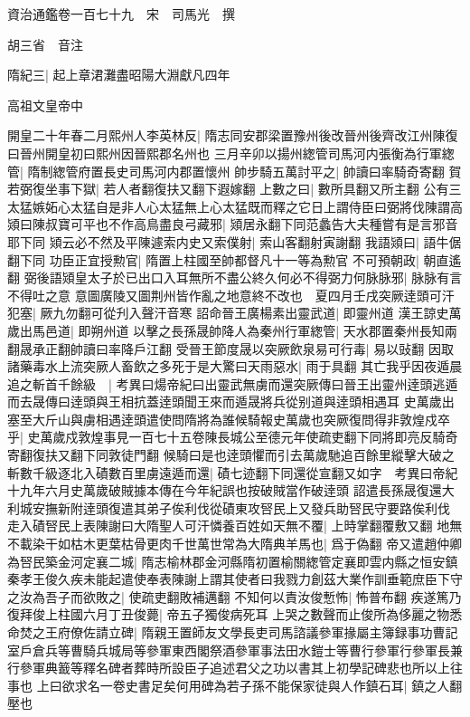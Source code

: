 資治通鑑卷一百七十九　宋　司馬光　撰

胡三省　音注

隋紀三|{
	起上章涒灘盡昭陽大淵獻凡四年}


高祖文皇帝中

開皇二十年春二月熙州人李英林反|{
	隋志同安郡梁置豫州後改晉州後齊改江州陳復曰晉州開皇初曰熙州因晉熙郡名州也}
三月辛卯以揚州緫管司馬河内張衡為行軍緫管|{
	隋制緫管府置長史司馬河内郡置懷州}
帥步騎五萬討平之|{
	帥讀曰率騎奇寄翻}
賀若弼復坐事下獄|{
	若人者翻復扶又翻下遐嫁翻}
上數之曰|{
	數所具翻又所主翻}
公有三太猛嫉妬心太猛自是非人心太猛無上心太猛既而釋之它日上謂侍臣曰弼將伐陳謂高熲曰陳叔寶可平也不作高鳥盡良弓藏邪|{
	熲居永翻下同范蠡告大夫種嘗有是言邪音耶下同}
熲云必不然及平陳遽索内史又索僕射|{
	索山客翻射寅謝翻}
我語熲曰|{
	語牛倨翻下同}
功臣正宜授勲官|{
	隋置上柱國至帥都督凡十一等為勲官}
不可預朝政|{
	朝直遙翻}
弼後語熲皇太子於已出口入耳無所不盡公終久何必不得弼力何脉脉邪|{
	脉脉有言不得吐之意}
意圖廣陵又圖荆州皆作亂之地意終不改也　夏四月壬戌突厥逹頭可汗犯塞|{
	厥九勿翻可從刋入聲汗音寒}
詔命晉王廣楊素出靈武道|{
	即靈州道}
漢王諒史萬歲出馬邑道|{
	即朔州道}
以擊之長孫晟帥降人為秦州行軍緫管|{
	天水郡置秦州長知兩翻晟承正翻帥讀曰率降戶江翻}
受晉王節度晟以突厥飲泉易可行毒|{
	易以䜴翻}
因取諸藥毒水上流突厥人畜飲之多死于是大驚曰天雨惡水|{
	雨于具翻}
其亡我乎因夜遁晨追之斬首千餘級　|{
	考異曰煬帝紀曰出靈武無虜而還突厥傳曰晉王出靈州逹頭逃遁而去晟傳曰逹頭與王相抗蓋逹頭聞王來而遁晟將兵從别道與逹頭相遇耳}
史萬歲出塞至大斤山與虜相遇逹頭遣使問隋將為誰候騎報史萬歲也突厥復問得非敦煌戍卒乎|{
	史萬歲戍敦煌事見一百七十五卷陳長城公至德元年使疏吏翻下同將即亮反騎奇寄翻復扶又翻下同敦徒門翻}
候騎曰是也逹頭懼而引去萬歲馳追百餘里縱擊大破之斬數千級逐北入磧數百里虜遠遁而還|{
	磧七迹翻下同還從宣翻又如字　考異曰帝紀十九年六月史萬歲破賊據本傳在今年紀誤也按破賊當作破逹頭}
詔遣長孫晟復還大利城安撫新附逹頭復遣其弟子俟利伐從磧東攻唘民上又發兵助唘民守要路俟利伐走入磧唘民上表陳謝曰大隋聖人可汗憐養百姓如天無不覆|{
	上時掌翻覆敷又翻}
地無不載染干如枯木更葉枯骨更肉千世萬世常為大隋典羊馬也|{
	爲于偽翻}
帝又遣趙仲卿為唘民築金河定襄二城|{
	隋志榆林郡金河縣隋初置榆關緫管定襄即雲内縣之恒安鎮}
秦孝王俊久疾未能起遣使奉表陳謝上謂其使者曰我戮力創茲大業作訓垂範庶臣下守之汝為吾子而欲敗之|{
	使疏吏翻敗補邁翻}
不知何以責汝俊慙怖|{
	怖普布翻}
疾遂篤乃復拜俊上柱國六月丁丑俊薨|{
	帝五子獨俊病死耳}
上哭之數聲而止俊所為侈麗之物悉命焚之王府僚佐請立碑|{
	隋親王置師友文學長吏司馬諮議參軍掾屬主簿録事功曹記室戶倉兵等曹騎兵城局等參軍東西閣祭酒參軍事法田水鎧士等曹行參軍行參軍長兼行參軍典籖等釋名碑者葬時所設臣子追述君父之功以書其上初學記碑悲也所以上往事也}
上曰欲求名一卷史書足矣何用碑為若子孫不能保家徒與人作鎮石耳|{
	鎮之人翻壓也}
